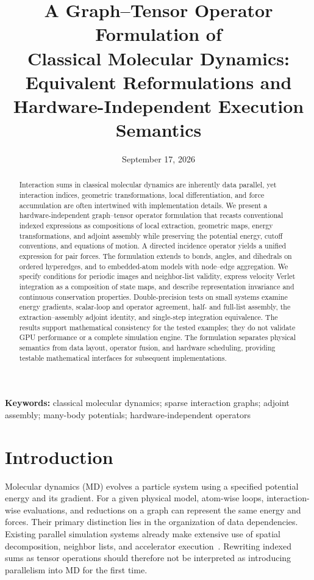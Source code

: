 \documentclass[11pt,a4paper]{article}
\title{A Graph--Tensor Operator Formulation of\\
Classical Molecular Dynamics:\\[0.4em]
\large Equivalent Reformulations and Hardware-Independent Execution Semantics}
\author{\paperauthors}
\date{September 17, 2026}
\theoremstyle{definition}
\begin{document}
\maketitle
\thispagestyle{plain}
\begin{abstract}
Interaction sums in classical molecular dynamics are inherently data parallel, yet interaction
indices, geometric transformations, local differentiation, and force accumulation are often
intertwined with implementation details. We present a hardware-independent graph--tensor
operator formulation that recasts conventional indexed expressions as compositions of local
extraction, geometric maps, energy transformations, and adjoint assembly while preserving the
potential energy, cutoff conventions, and equations of motion. A directed incidence operator
yields a unified expression for pair forces. The formulation extends to bonds, angles, and
dihedrals on ordered hyperedges, and to embedded-atom models with node--edge aggregation. We
specify conditions for periodic images and neighbor-list validity, express velocity Verlet
integration as a composition of state maps, and describe representation invariance and
continuous conservation properties. Double-precision tests on small systems examine energy
gradients, scalar-loop and operator agreement, half- and full-list assembly, the
extraction--assembly adjoint identity, and single-step integration equivalence.
The results support mathematical consistency for the tested
examples; they do not validate GPU performance or a complete simulation engine. The formulation
separates physical semantics from data layout, operator fusion, and hardware scheduling,
providing testable mathematical interfaces for subsequent implementations.
\end{abstract}
\noindent\textbf{Keywords:} classical molecular dynamics; sparse interaction graphs; adjoint assembly; many-body potentials; hardware-independent operators

\section{Introduction}
\label{sec:intro}
Molecular dynamics (MD) evolves a particle system using a specified potential energy and its
gradient. For a given physical model, atom-wise loops, interaction-wise evaluations, and
reductions on a graph can represent the same energy and forces. Their primary distinction lies
in the organization of data dependencies. Existing parallel simulation systems already make
extensive use of spatial decomposition, neighbor lists, and accelerator
execution~\cite{thompson2022,anderson2020}. Rewriting indexed sums as tensor operations should
therefore not be interpreted as introducing parallelism into MD for the first time.
\end{document}
